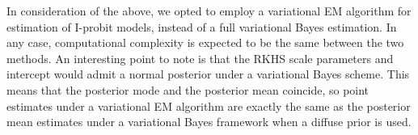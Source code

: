 \documentclass[showframe,11pt,twoside,openright]{report}
\begin{document}
In consideration of the above, we opted to employ a variational EM algorithm for estimation of I-probit models, instead of a full variational Bayes estimation.
In any case, computational complexity is expected to be the same between the two methods.
An interesting point to note is that the RKHS scale parameters and intercept would admit a normal posterior under a variational Bayes scheme. 
This means that the posterior mode and the posterior mean coincide, so point estimates under a variational EM algorithm are exactly the same as the posterior mean estimates under a variational Bayes framework when a diffuse prior is used.

\hClosingStuffStandalone
\end{document}
